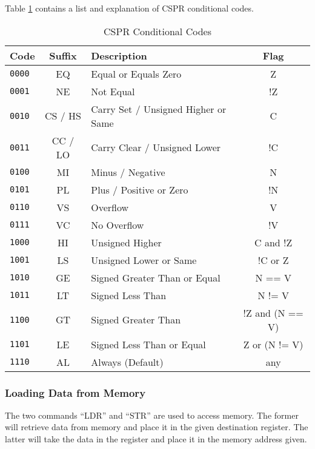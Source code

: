 				Table \ref{tab:CSPRConditionCodes} contains a list and explanation of CSPR conditional codes. 
				\begin{table}[htb]
					\centering
					\begin{tabular}{|l|c|l|c|}
						\hline
						\textbf{Code} & \textbf{Suffix} & \textbf{Description} & \textbf{Flag} \\ \hline
						\texttt{0000} & EQ & Equal or Equals Zero & Z \\ \hline
						\texttt{0001} & NE & Not Equal & !Z \\ \hline
						\texttt{0010} & CS / HS & Carry Set / Unsigned Higher or Same & C \\ \hline
						\texttt{0011} & CC / LO & Carry Clear / Unsigned Lower & !C \\ \hline
						\texttt{0100} & MI & Minus / Negative & N \\ \hline
						\texttt{0101} & PL & Plus / Positive or Zero & !N \\ \hline
						\texttt{0110} & VS & Overflow & V \\ \hline
						\texttt{0111} & VC & No Overflow & !V \\ \hline
						\texttt{1000} & HI & Unsigned Higher & C and !Z  \\ \hline
						\texttt{1001} & LS & Unsigned Lower or Same & !C or Z \\ \hline
						\texttt{1010} & GE & Signed Greater Than or Equal & N == V \\ \hline 
						\texttt{1011} & LT & Signed Less Than & N != V \\ \hline
						\texttt{1100} & GT & Signed Greater Than & !Z and (N == V) \\ \hline
						\texttt{1101} & LE & Signed Less Than or Equal & Z or (N != V) \\ \hline
						\texttt{1110} & AL & Always (Default) & any \\ \hline
					\end{tabular}
					\caption{CSPR Conditional Codes}
					\label{tab:CSPRConditionCodes}
				\end{table}


			\subsubsection{Loading Data from Memory}
				The two commands ``LDR'' and ``STR'' are used to access memory. 
				The former will retrieve data from memory and place it in the given destination register. 
				The latter will take the data in the register and place it in the memory address given. 

